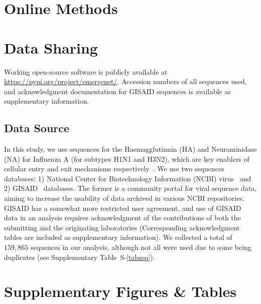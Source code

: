 \documentclass[onecolumn, compsoc,10pt]{IEEEtran}
\def\SUPPLEMENTARY{Supplementary\xspace}
\def\METHODS{Online Methods\xspace}
\begin{document}
\section*{\METHODS}



\section*{Data Sharing} 

Working open-source software is publicly available at \href{https://pypi.org/project/quasinet/}{https://pypi.org/project/emergenet/}.
Accession numbers of all sequences used, and acknowledgment documentation for GISAID sequences is available as supplementary information.


\subsection*{Data Source}

In this study, we use sequences for the Haemagglutinnin (HA)  and Neuraminidase (NA) for Influenza A (for subtypes H1N1 and H3N2), which are key enablers of cellular entry and exit mechanisms respectively~\cite{mcauley2019influenza}. We use two sequences databases: 1) National Center for Biotechnology Information (NCBI) virus~\cite{hatcher2017virus} and 2) GISAID~\cite{bogner2006global} databases. The former is a community portal for viral sequence data, aiming to increase the usability of data archived in various NCBI repositories. GISAID has a somewhat more restricted user agreement, and use of GISAID data in an analysis requires acknowledgment of the contributions of both the submitting and the originating laboratories (Corresponding acknowledgment tables are included as supplementary information). We collected a total of $159,865$ sequences in our analysis, although not all were used due to some being duplicates (see \SUPPLEMENTARY Table~S-\ref{tabseq}).








\clearpage                                                                      
\setcounter{figure}{0}
\renewcommand{\figurename}{Extended Data Figure}                               
\setcounter{table}{0}                                     
\renewcommand{\tablename}{Extended Data Table}                                 


\clearpage



\section*{Supplementary Figures \& Tables}


\end{document}
